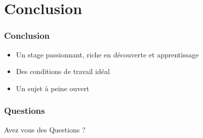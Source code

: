 \documentclass{beamer}
\begin{document}
	\section{Conclusion}
		\begin{frame}
			\frametitle{Conclusion}
			\begin{itemize}
			  \item Un stage passionnant, riche en découverte et apprentissage
			  \item Des conditions de travail idéal
			  \item Un sujet à peine ouvert 
			\end{itemize}
		\end{frame}
		\begin{frame}
			\frametitle{Questions}
				Avez vous des Questions ?
		\end{frame}
\end{document}

